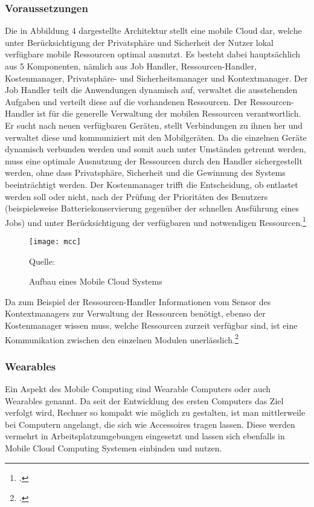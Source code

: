 \subsubsection{Voraussetzungen}
Die in Abbildung 4 dargestellte Architektur stellt eine mobile Cloud dar, welche unter Berücksichtigung der Privatsphäre und Sicherheit der Nutzer lokal verfügbare mobile Ressourcen optimal ausnutzt. Es besteht dabei hauptsächlich aus 5 Komponenten, nämlich aus Job Handler, Ressourcen-Handler, Kostenmanager, Privatsphäre- und Sicherheitsmanager und Kontextmanager. Der Job Handler teilt die Anwendungen dynamisch auf, verwaltet die ausstehenden Aufgaben und verteilt diese auf die vorhandenen Ressourcen. Der Ressourcen-Handler ist für die generelle Verwaltung der mobilen Ressourcen verantwortlich. Er sucht nach neuen verfügbaren Geräten, stellt Verbindungen zu ihnen her und verwaltet diese und kommuniziert mit den Mobilgeräten. Da die einzelnen Geräte dynamisch verbunden werden und somit auch unter Umständen getrennt werden, muss eine optimale Ausnutzung der Ressourcen durch den Handler sichergestellt werden, ohne dass Privatsphäre, Sicherheit und die Gewinnung des Systems beeinträchtigt werden. Der Kostenmanager trifft die Entscheidung, ob entlastet werden soll oder nicht, nach der Prüfung der Prioritäten des Benutzers (beispielsweise Batteriekonservierung gegenüber der schnellen Ausführung eines Jobs) und unter Berücksichtigung der verfügbaren und notwendigen Ressourcen.\footcite[Vgl.][Seite 102 f.]{MCC}

\begin{figure}[H]
\begin{center}
\texttt{[image: mcc]}
\caption{Aufbau eines Mobile Cloud Systems}
Quelle: \cite[Seite 103]{MCC}
\end{center}
\end{figure}
\vspace{-1cm}

Da zum Beispiel der Ressourcen-Handler Informationen vom Sensor des Kontextmanagers zur Verwaltung der Ressourcen benötigt, ebenso der Kostenmanager wissen muss, welche Ressourcen zurzeit verfügbar sind, ist eine Kommunikation zwischen den einzelnen Modulen unerlässlich.\footcite[Vgl.][Seite 103]{MCC}

\subsubsection{Wearables}
Ein Aspekt des Mobile Computing sind Wearable Computers oder auch Wearables genannt. Da seit der Entwicklung des ersten Computers das Ziel verfolgt wird, Rechner so kompakt wie möglich zu gestalten, ist man mittlerweile bei Computern angelangt, die sich wie Accessoires tragen lassen. Diese werden vermehrt in Arbeitsplatzumgebungen eingesetzt und lassen sich ebenfalls in Mobile Cloud Computing Systemen einbinden und nutzen.

